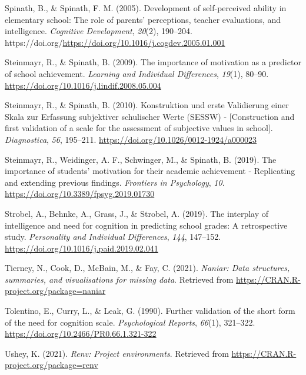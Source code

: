 \documentclass[
  man]{apa6}
\newlength{\cslhangindent}
\newlength{\cslentryspacingunit} %
\newenvironment{CSLReferences}[2] %
 {%
  \setlength{\parindent}{0pt}
  \ifodd #1
  \let\oldpar\par
  \def\par{\hangindent=\cslhangindent\oldpar}
  \fi
  \setlength{\parskip}{#2\cslentryspacingunit}
 }%
 {}
\begin{document}
\begin{CSLReferences}{1}{0}
\leavevmode{}%
Spinath, B., \& Spinath, F. M. (2005). Development of self-perceived ability in elementary school: The role of parents' perceptions, teacher evaluations, and intelligence. \emph{Cognitive Development}, \emph{20}(2), 190--204. https://doi.org/\url{https://doi.org/10.1016/j.cogdev.2005.01.001}

\leavevmode{}%
Steinmayr, R., \& Spinath, B. (2009). The importance of motivation as a predictor of school achievement. \emph{Learning and Individual Differences}, \emph{19}(1), 80--90. \url{https://doi.org/10.1016/j.lindif.2008.05.004}

\leavevmode{}%
Steinmayr, R., \& Spinath, B. (2010). {Konstruktion und erste Validierung einer Skala zur Erfassung subjektiver schulischer Werte (SESSW) - {[}Construction and first validation of a scale for the assessment of subjective values in school{]}}. \emph{Diagnostica}, \emph{56}, 195--211. \url{https://doi.org/10.1026/0012-1924/a000023}

\leavevmode{}%
Steinmayr, R., Weidinger, A. F., Schwinger, M., \& Spinath, B. (2019). The importance of students' motivation for their academic achievement - {R}eplicating and extending previous findings. \emph{Frontiers in Psychology}, \emph{10}. \url{https://doi.org/10.3389/fpsyg.2019.01730}

\leavevmode{}%
Strobel, A., Behnke, A., Grass, J., \& Strobel, A. (2019). The interplay of intelligence and need for cognition in predicting school grades: A retrospective study. \emph{Personality and Individual Differences}, \emph{144}, 147--152. \url{https://doi.org/10.1016/j.paid.2019.02.041}

\leavevmode{}%
Tierney, N., Cook, D., McBain, M., \& Fay, C. (2021). \emph{Naniar: Data structures, summaries, and visualisations for missing data}. Retrieved from \url{https://CRAN.R-project.org/package=naniar}

\leavevmode{}%
Tolentino, E., Curry, L., \& Leak, G. (1990). Further validation of the short form of the need for cognition scale. \emph{Psychological Reports}, \emph{66}(1), 321--322. \url{https://doi.org/10.2466/PR0.66.1.321-322}

\leavevmode{}%
Ushey, K. (2021). \emph{Renv: Project environments}. Retrieved from \url{https://CRAN.R-project.org/package=renv}


\end{CSLReferences}
\end{document}
